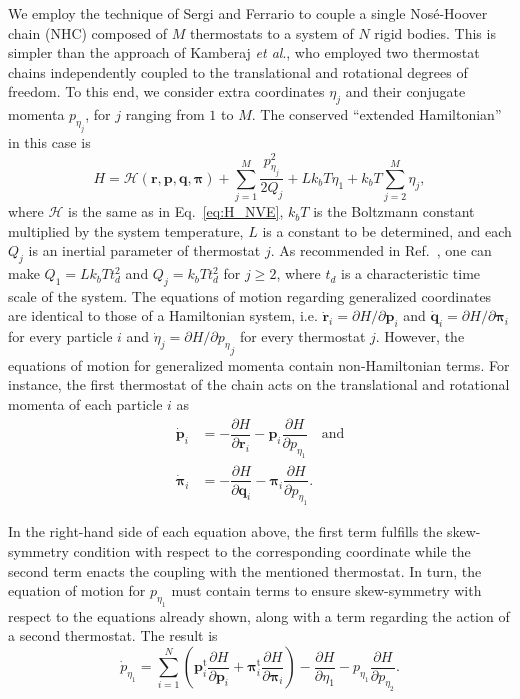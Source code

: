 \documentclass[aip,jcp,reprint,amsmath,amssymb]{revtex4-1}
\newcommand{\vt}[1]{\boldsymbol{\mathbf{#1}}}           %
\newcommand{\tr}[1]{#1^\text{t}}                        %
\newcommand{\diff}[2]{\dfrac{\partial #1}{\partial #2}} %
\begin{document}
We employ the technique of Sergi and Ferrario\cite{Sergi2001} to couple a single Nos\'e-Hoover chain\cite{Martyna1992} (NHC) composed of $M$ thermostats to a system of $N$ rigid bodies. This is simpler than the approach of Kamberaj \textit{et al}.,\cite{Kamberaj2005} who employed two thermostat chains independently coupled to the translational and rotational degrees of freedom. To this end, we consider extra coordinates $\eta_j$ and their conjugate momenta $p_{\eta_j}$, for $j$ ranging from $1$ to $M$. The conserved ``extended Hamiltonian'' in this case is
\begin{equation}
\label{eq:H_nvt}
H = \mathcal{H}(\vt r,\vt p,\vt q,\vt \pi) + \sum_{j=1}^{M}\frac{p_{\eta_j}^2}{2Q_j} + L k_b T\eta_1 + k_b T\sum_{j=2}^M \eta_j,
\end{equation}
where $\mathcal H$ is the same as in Eq.~\eqref{eq:H_NVE}, $k_b T$ is the Boltzmann constant multiplied by the system temperature, $L$ is a constant to be determined, and each $Q_j$ is an inertial parameter of thermostat $j$. As recommended in Ref.~, one can make $Q_1 = L k_b T t_d^2$ and $Q_j = k_b T t_d^2$ for $j \geq 2$, where $t_d$ is a characteristic time scale of the system. The equations of motion regarding generalized coordinates are identical to those of a Hamiltonian system, i.e. $\dot{\vt r}_i = {\partial H}/{\partial \vt p_i}$ and $\dot{\vt q}_i = {\partial H}/{\partial \vt \pi_i}$ for every particle $i$ and $\dot{\eta}_j = {\partial H}/{\partial {p_\eta}_j}$ for every thermostat $j$. However, the equations of motion for generalized momenta contain non-Hamiltonian terms. For instance, the first thermostat of the chain acts on the translational and rotational momenta of each particle $i$ as
\[
\begin{split}
\dot{\vt p}_i &= -\diff{H}{\vt r_i} - {\vt p}_i \diff{H}{p_{\eta_1}} \quad \text{and} \\
\dot{\vt \pi}_i &= -\diff{H}{\vt q_i} - {\vt \pi}_i \diff{H}{p_{\eta_1}}.
\end{split}
\]

In the right-hand side of each equation above, the first term fulfills the skew-symmetry condition with respect to the corresponding coordinate while the second term enacts the coupling with the mentioned thermostat. In turn, the equation of motion for $p_{\eta_1}$ must contain terms to ensure skew-symmetry with respect to the equations already shown, along with a term regarding the action of a second thermostat. The result is
\[
{\dot p}_{\eta_1} = \sum_{i=1}^N \left( \tr{\vt p_i} \diff{H}{\vt p_i} + \tr{\vt \pi_i} \diff{H}{\vt \pi_i}\right) - \diff{H}{\eta_1} - p_{\eta_1} \diff{H}{p_{\eta_2}}.
\]
\end{document}
